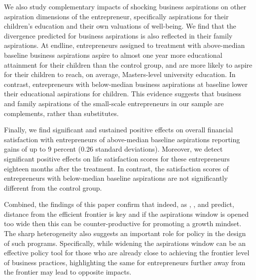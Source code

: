 \documentclass[11.5pt]{article}
\begin{document}
We also study complementary impacts of shocking business aspirations on other aspiration dimensions of the entrepreneur, specifically aspirations for their children's education and their own valuations of well-being. We find that the divergence predicted for business aspirations is also reflected in their family aspirations. At endline, entrepreneurs assigned to treatment with above-median baseline business aspirations aspire to almost one year more educational attainment for their children than the control group, and are more likely to aspire for their children to reach, on average, Masters-level university education. In contrast, entrepreneurs with below-median business aspirations at baseline lower their educational aspirations for children. This evidence suggests that business and family aspirations of the small-scale entrepreneurs in our sample are complements, rather than substitutes.

Finally, we find significant and sustained positive effects on overall financial satisfaction with entrepreneurs of above-median baseline aspirations reporting gains of up to 9 percent (0.26 standard deviations). Moreover, we detect significant positive effects on life satisfaction scores for these entrepreneurs eighteen months after the treatment. In contrast, the satisfaction scores of entrepreneurs with below-median baseline aspirations are not significantly different from the control group. 

Combined, the findings of this paper confirm that indeed, as \citet{Ray2006}, \citet{Dalton2016}, and \citet{Genicot2017} predict, distance from the efficient frontier is key and if the aspirations window is opened too wide then this can be counter-productive for promoting a growth mindset. The sharp heterogeneity also suggests an important role for policy in the design of such programs. Specifically, while widening the aspirations window can be an effective policy tool for those who are already close to achieving the frontier level of business practices, highlighting the same for entrepreneurs further away from the frontier may lead to opposite impacts.
\end{document}
